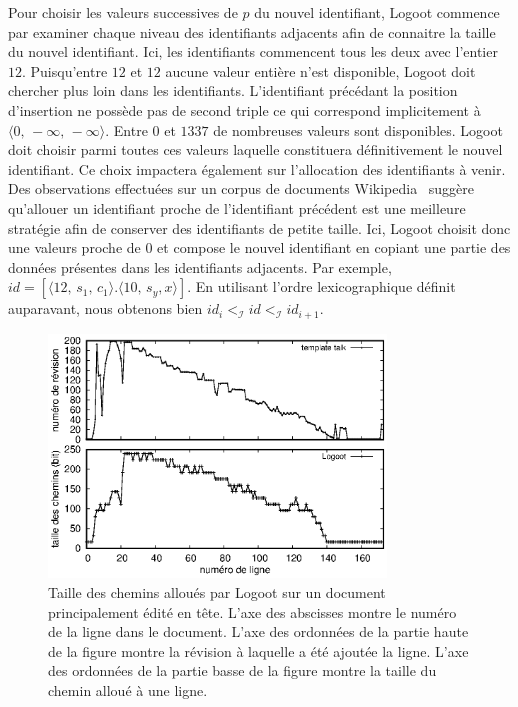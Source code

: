Pour choisir les valeurs successives de $p$ du nouvel identifiant, Logoot
commence par examiner chaque niveau des identifiants adjacents afin de connaitre
la taille du nouvel identifiant. Ici, les identifiants commencent tous les deux
avec l'entier $12$.  Puisqu'entre $12$ et $12$ aucune valeur entière n'est
disponible, Logoot doit chercher plus loin dans les identifiants. L'identifiant
précédant la position d'insertion ne possède pas de second triple ce qui
correspond implicitement à $\langle 0,\, -\infty ,\, -\infty \rangle$.  Entre
$0$ et $1337$ de nombreuses valeurs sont disponibles.  Logoot doit choisir parmi
toutes ces valeurs laquelle constituera définitivement le nouvel identifiant. Ce
choix impactera également sur l'allocation des identifiants à venir.
Des observations effectuées sur un corpus de documents
Wikipedia~\cite{wikipedia} suggère qu'allouer un identifiant proche de
l'identifiant précédent est une meilleure stratégie afin de conserver des
identifiants de petite taille.  Ici, Logoot choisit donc une valeurs proche de
$0$ et compose le nouvel identifiant en copiant une partie des données présentes
dans les identifiants adjacents. Par exemple,
$id = [\langle 12,\, s_1,\,c_1 \rangle.\langle 10,\,s_y, x\rangle]$.  En
utilisant l'ordre lexicographique définit auparavant, nous obtenons bien
$id_{i} <_\mathcal{I} id <_\mathcal{I} id_{i+1}$.

\begin{figure}
  \begin{center}
    \includegraphics[width=0.8\textwidth]{img/lseq/motivationlogoot.eps}
    \caption[Taille des chemins alloués par Logoot sur un document édité en
    tête]{\label{repl:img:motivationlogoot} Taille des chemins alloués par
      Logoot sur un document principalement édité en tête. L'axe des abscisses
      montre le numéro de la ligne dans le document. L'axe des ordonnées de la
      partie haute de la figure montre la révision à laquelle a été ajoutée la
      ligne. L'axe des ordonnées de la partie basse de la figure montre la taille
      du chemin alloué à une ligne.}
  \end{center}
\end{figure}

